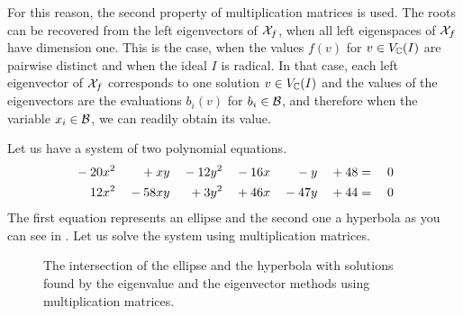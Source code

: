 For this reason, the second property of multiplication matrices is used.
The roots can be recovered from the left eigenvectors of $\mathcal{X}_f$, when all left eigenspaces of $\mathcal{X}_f$ have dimension one.
This is the case, when the values $f(v)$ for $v\in V_{\mathbb{C}}(I)$ are pairwise distinct and when the ideal $I$ is radical.
In that case, each left eigenvector of $\mathcal{X}_f$ corresponds to one solution $v\in V_{\mathbb{C}}(I)$ and the values of the eigenvectors are the evaluations $b_i(v)$ for $b_i\in\mathcal{B}$, and therefore when the variable $x_i\in\mathcal{B}$, we can readily obtain its value.

\begin{example}
  Let us have a system of two polynomial equations.
  \begin{alignat}{7}
    {}-{}20 & x^2 & {}+{}   & xy & {}-{}12 & y^2 & {}-{}16 & x & {}-{}   & y & {}+{}48 & {}={} & 0 \labeleq{POP:mm:example1}\\
    12      & x^2 & {}-{}58 & xy & {}+{}3  & y^2 & {}+{}46 & x & {}-{}47 & y & {}+{}44 & {}={} & 0 \labeleq{POP:mm:example2}
  \end{alignat}
  The first equation represents an ellipse and the second one a hyperbola as you can see in .
  Let us solve the system using multiplication matrices.

  \begin{figure}[ht]
    \centering
    \resizebox{0.95\textwidth}{!}{}
    \caption{The intersection of the ellipse  and the hyperbola  with solutions found by the eigenvalue and the eigenvector methods using multiplication matrices.}
  \end{figure}


\end{example}
